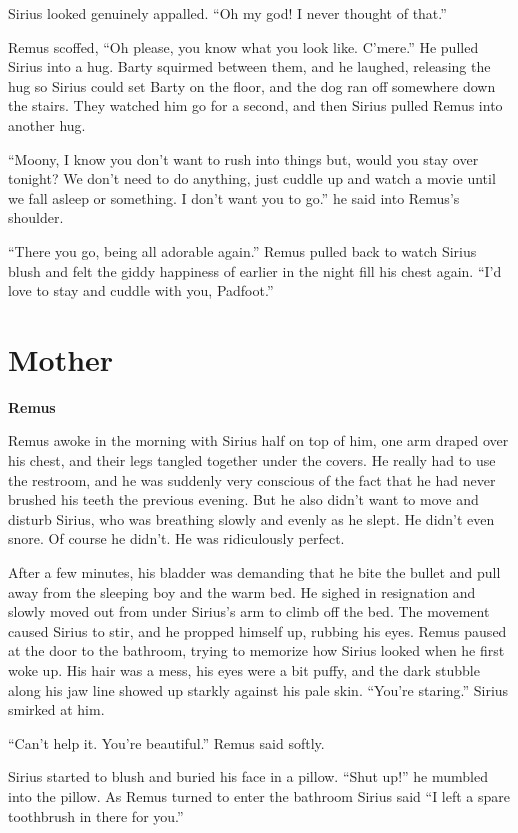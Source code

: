 \documentclass[12pt,twoside,openright]{memoir}
\begin{document}
Sirius looked genuinely appalled. ``Oh my god! I never thought of that.''

Remus scoffed, ``Oh please, you know what you look like. C'mere.'' He pulled Sirius into a hug. Barty squirmed between them, and he laughed, releasing the hug so Sirius could set Barty on the floor, and the dog ran off somewhere down the stairs. They watched him go for a second, and then Sirius pulled Remus into another hug.

``Moony, I know you don't want to rush into things but, would you stay over tonight? We don't need to do anything, just cuddle up and watch a movie until we fall asleep or something. I don't want you to go.'' he said into Remus's shoulder.

``There you go, being all adorable again.'' Remus pulled back to watch Sirius blush and felt the giddy happiness of earlier in the night fill his chest again. ``I'd love to stay and cuddle with you, Padfoot.''

\chapter{Mother}

\textbf{Remus} 

Remus awoke in the morning with Sirius half on top of him, one arm draped over his chest, and their legs tangled together under the covers. He really had to use the restroom, and he was suddenly very conscious of the fact that he had never brushed his teeth the previous evening. But he also didn't want to move and disturb Sirius, who was breathing slowly and evenly as he slept. He didn't even snore. Of course he didn't. He was ridiculously perfect.

After a few minutes, his bladder was demanding that he bite the bullet and pull away from the sleeping boy and the warm bed. He sighed in resignation and slowly moved out from under Sirius's arm to climb off the bed. The movement caused Sirius to stir, and he propped himself up, rubbing his eyes. Remus paused at the door to the bathroom, trying to memorize how Sirius looked when he first woke up. His hair was a mess, his eyes were a bit puffy, and the dark stubble along his jaw line showed up starkly against his pale skin. ``You're staring.'' Sirius smirked at him.

``Can't help it. You're beautiful.'' Remus said softly.

Sirius started to blush and buried his face in a pillow. ``Shut up!'' he mumbled into the pillow. As Remus turned to enter the bathroom Sirius said ``I left a spare toothbrush in there for you.''
\end{document}
